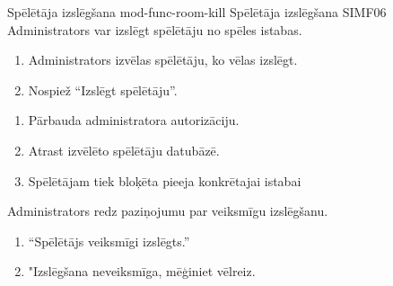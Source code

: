 \moduleFunctionTable
{Spēlētāja izslēgšana}
{mod-func-room-kill}
{Spēlētāja izslēgšana}
{SIMF06}
{
	Administrators var izslēgt spēlētāju no spēles istabas.
}
{
	\begin{enumerate}
		\item Administrators izvēlas spēlētāju, ko vēlas izslēgt.
		\item Nospiež ``Izslēgt spēlētāju''.
	\end{enumerate}
}
{
	\begin{enumerate}
		\item Pārbauda administratora autorizāciju.
		\item Atrast izvēlēto spēlētāju datubāzē.
		\item Spēlētājam tiek bloķēta pieeja konkrētajai istabai
	\end{enumerate}
}
{
	Administrators redz paziņojumu par veiksmīgu izslēgšanu.
}
{
	\begin{enumerate}
		\item ``Spēlētājs veiksmīgi izslēgts.''
		\item "Izslēgšana neveiksmīga, mēģiniet vēlreiz.
	\end{enumerate}
}
